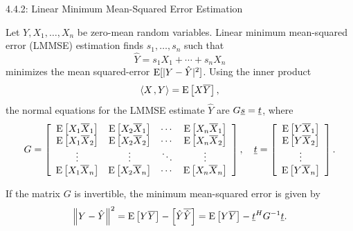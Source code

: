 \documentclass[10pt,letterpaper,english]{beamer}
\begin{document}
\begin{frame}{4.4.2: Linear Minimum Mean-Squared Error Estimation}

Let $Y, X_1, \ldots, X_n$ be zero-mean random variables.
Linear minimum mean-squared error (LMMSE) estimation finds $s_1, \ldots, s_n$ such that
\[ \hat{Y} = s_1 X_1 + \cdots + s_n X_n \]
minimizes the mean squared-error $\mathrm{E}[|Y-\hat{Y}|^2]$.
Using the inner product
\begin{equation*}
{\left\langle  X  \mskip2mu ,  Y  \right\rangle} = \mathrm{E} \left[ X \overline{Y} \right],
\end{equation*}
the normal equations for the LMMSE estimate $\hat{Y}$ are $G \underline{s} = \underline{t}$, where
\begin{equation*}
G = \left[ \begin{array}{cccc}
\mathrm{E} \left[ X_1 \overline{X}_1 \right]
& \mathrm{E} \left[ X_2 \overline{X}_1 \right] & \cdots
& \mathrm{E} \left[ X_n \overline{X}_1 \right] \\
\mathrm{E} \left[ X_1 \overline{X}_2 \right]
& \mathrm{E} \left[ X_2 \overline{X}_2 \right] & \cdots
& \mathrm{E} \left[ X_n \overline{X}_2 \right] \\
\vdots & \vdots & \ddots & \vdots \\
\mathrm{E} \left[ X_1 \overline{X}_n \right]
& \mathrm{E} \left[ X_2 \overline{X}_n \right] & \cdots
& \mathrm{E} \left[ X_n \overline{X}_n \right] \\
\end{array} \right], \quad \underline{t} = \left[ \begin{array}{c}
\mathrm{E} \left[ Y \overline{X}_1 \right] \\
\mathrm{E} \left[ Y \overline{X}_2 \right] \\ \vdots \\
\mathrm{E} \left[ Y \overline{X}_n \right] \end{array} \right].
\end{equation*}

If the matrix $G$ is invertible, the minimum mean-squared error is given by
\begin{equation*}
\left\| Y - \hat{Y} \right\|^2 = \mathrm{E} \left[ Y \overline{Y} \right]
- \left[ \hat{Y} \overline{\hat{Y}} \right] = \mathrm{E} \left[ Y \overline{Y} \right] - \underline{t}^H G^{-1} \underline{t} .
\end{equation*}

\end{frame}
\end{document}
